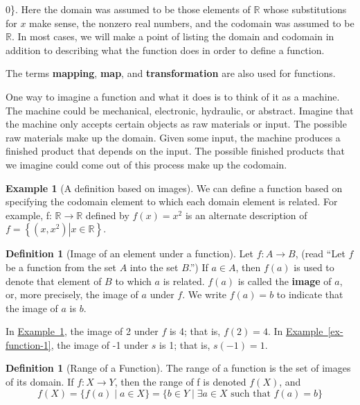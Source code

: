 \documentclass[10pt,]{book}
\newcommand{\terminology}[1]{\textbf{#1}}
\theoremstyle{plain}
\theoremstyle{definition}
\newtheorem{definition}[theorem]{Definition}
\theoremstyle{definition}
\newtheorem{example}[theorem]{Example}
\theoremstyle{definition}
\begin{document}
0\right\}\). Here the domain was assumed to be those elements of \(\mathbb{R}\) whose substitutions for \(x\) make sense, the nonzero real numbers,
and the codomain was assumed to be \(\mathbb{R}\). In most cases, we will make a point of listing the domain and codomain in addition to describing what the function does in order to define a function. %
\par
The terms \terminology{mapping}, \terminology{map}, and \terminology{transformation} are also used for functions.%
\par
One way to imagine a function and what it does is to think of it as a machine. The machine could be mechanical, electronic, hydraulic, or abstract. Imagine that the machine only accepts certain objects as raw materials or input. The possible raw materials make up the domain. Given some input, the machine produces a finished product that depends on the input. The possible finished products that we imagine could come out of this process make up the codomain.%
\begin{example}[A definition based on images]\label{ex-non-pair-description}
We can define a function based on specifying the codomain element to which each domain element is related.   For example, f: \(\mathbb{R} \rightarrow \mathbb{R}\) defined by \(f(x) = x^2\) is an alternate description of \(f= \left\{\left.\left(x,
x ^2\right)\right|x \in  \mathbb{R}\right\}\).%
\end{example}
\begin{definition}[Image of an element under a function]\label{def-image-of-an-element}
\label{notation-2}
Let \(f:A \rightarrow  B\), (read ``Let \(f\) be a function from the set \(A\) into
the set \(B\).'') If \(a \in  A\), then \(f(a)\) is used to denote that element of \(B\) to which \(a\) is related.
\(f(a)\) is called the \terminology{image} of \(a\), or, more precisely, the image of \(a\) under \( f\). We write \(f(a) = b\) to indicate that the image of \(a\) is \(b\).%
\end{definition}
\par
In \hyperref[ex-non-pair-description]{Example~\ref{ex-non-pair-description}}, the image of 2 under \(f\) is 4; that is, \(f(2) = 4\). In \hyperref[ex-function-1]{Example~\ref{ex-function-1}}, the image of -1 under \(s\) is 1; that is,
\(s(-1) = 1\).%
\begin{definition}[Range of a Function]\label{def-range-of-function}
\label{notation-3}
 The range of a function is the set of images of its domain. If \(f:X \rightarrow Y\), then the range of f is denoted \(f(X)\), and  
\begin{equation*}f(X) = \{f(a) \mid a \in X\} = \{b \in Y \mid  \exists a \in X\textrm{ such that } f(a) = b\}\end{equation*}%
\end{definition}
\end{document}
